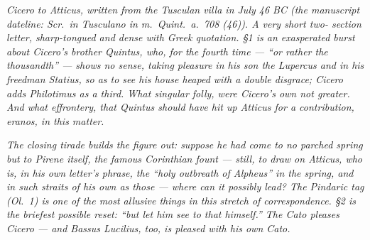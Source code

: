 
\textit{Cicero to Atticus, written from the Tusculan villa
in July 46 BC (the manuscript dateline: \textit{Scr.\ in
Tusculano in m.\ Quint.\ a.\ 708 (46)}). A very short two-
section letter, sharp-tongued and dense with Greek
quotation. \S1 is an exasperated burst about Cicero's
brother Quintus, who, for the fourth time --- ``or rather
the thousandth'' --- shows no sense, taking pleasure in his
son the Lupercus and in his freedman Statius, so as to see
his house heaped with a double disgrace; Cicero adds
Philotimus as a third. What singular folly, were Cicero's
own not greater. And what effrontery, that Quintus should
have hit up Atticus for a contribution, \textit{eranos}, in
this matter.}

\textit{The closing tirade builds the figure out: suppose
he had come to no parched spring but to Pirene itself, the
famous Corinthian fount --- still, to draw on Atticus, who
is, in his own letter's phrase, the ``holy outbreath of
Alpheus'' in the spring, and in such straits of his own as
those --- where can it possibly lead? The Pindaric tag
(\textit{Ol.}\ 1) is one of the most allusive things in this
stretch of correspondence. \S2 is the briefest possible
reset: ``but let him see to that himself.'' The Cato pleases
Cicero --- and Bassus Lucilius, too, is pleased with his own
\textit{Cato}.}
